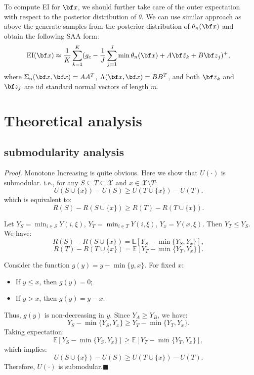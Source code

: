 \documentclass[opre,sglanonrev]{informs4}
\begin{document}
To compute EI for ${\bf x}$, we should further take care of the outer expectation with respect to the posterior distribution of $\theta$. We can use similar approach as above the generate samples from the posterior distribution of $\theta_n({\bf x})$ and obtain the following SAA form:
$$
\text{EI}({\bf x}) \approx \frac{1}{K}\sum_{k=1}^{K} (g_c-  \frac{1}{J}\sum_{j=1}^{J} \min \theta_n({\bf x}) + A{\bf \tilde{z}}_k + B{\bf z}_j )^+,
$$ 
where $\Sigma_n({\bf x},{\bf x}) = AA^T$, $\Lambda({\bf x},{\bf x}) = BB^T$, and both ${\bf \tilde{z}}_k$ and ${\bf z}_j$ are iid standard normal vectors of length $m$.

\section{Theoretical analysis}
\subsection{submodularity analysis}
\textit{Proof.} Monotone Increasing is quite obvious. Here we show that $U(\cdot)$ is submodular. i.e., for any $S \subseteq T \subseteq \mathcal{X}$ and $x \in \mathcal{X} \setminus T$:
$$
U(S \cup \{x\}) - U(S) \geq U(T \cup \{x\}) - U(T).
$$
which is equivalent to:
$$
R(S)-R(S \cup \{x\}) \geq R(T) - R(T \cup \{x\}).
$$

Let $Y_S = \min_{i \in S} Y(i,\xi)$, $Y_T = \min_{i \in T} Y(i,\xi)$, $Y_x = Y(x,\xi)$. Then $Y_T \leq Y_S$. We have:
\[
R(S) - R(S \cup \{x\}) = \mathbb{E}\left[Y_S - \min\{Y_S, Y_x\}\right],
\]
\[
R(T) - R(T \cup \{x\}) = \mathbb{E}\left[Y_T - \min\{Y_T, Y_x\}\right].
\]

Consider the function $g(y) = y - \min\{y, x\}$. For fixed $x$:
\begin{itemize}
    \item If $y \leq x$, then $g(y) = 0$;
    \item If $y > x$, then $g(y) = y - x$.
\end{itemize}
Thus, $g(y)$ is non-decreasing in $y$. Since $Y_A \geq Y_B$, we have:
\[
Y_S - \min\{Y_S, Y_x\} \geq Y_T - \min\{Y_T, Y_x\}.
\]
Taking expectation:
\[
\mathbb{E}\left[Y_S - \min\{Y_S, Y_x\}\right] \geq \mathbb{E}\left[Y_T - \min\{Y_T, Y_x\}\right],
\]
which implies:
$$
U(S \cup \{x\}) - U(S) \geq U(T \cup \{x\}) - U(T).
$$
Therefore, $U(\cdot)$ is submodular.\hfill $\blacksquare$
\end{document}
